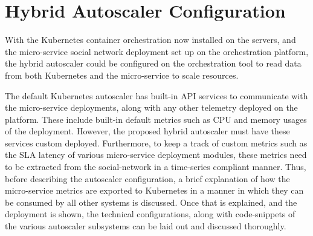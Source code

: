 \section{Hybrid Autoscaler Configuration}
\label{sec:ch5-hybrid-auto-arch}



With the Kubernetes container orchestration now installed on the servers, and the micro-service social network deployment set up on the orchestration platform, the hybrid autoscaler could be configured on the orchestration tool to read data from both Kubernetes and the micro-service to scale resources.\par

The default Kubernetes autoscaler has built-in API services to communicate with the micro-service deployments, along with any other telemetry deployed on the platform. These include built-in default metrics such as CPU and memory usages of the deployment. However, the proposed hybrid autoscaler must have these services custom deployed. Furthermore, to keep a track of custom metrics such as the SLA latency of various micro-service deployment modules, these metrics need to be extracted from the social-network in a time-series compliant manner. Thus, before describing the autoscaler configuration, a brief explanation of how the micro-service metrics are exported to Kubernetes in a manner in which they can be consumed by all other systems is discussed. Once that is explained, and the deployment is shown, the technical configurations, along with code-snippets of the various autoscaler subsystems can be laid out and discussed thoroughly.\par

